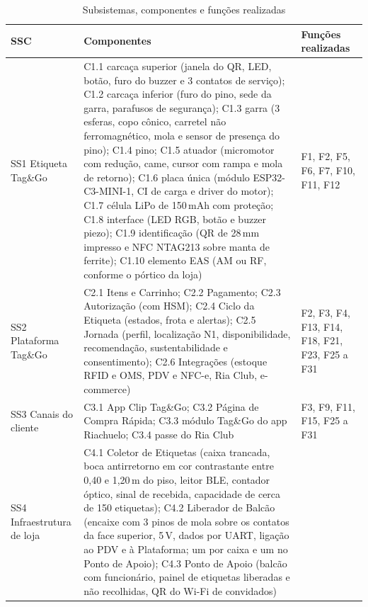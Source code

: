 \begin{table}[htbp]
    \centering
    \caption{Subsistemas, componentes e funções realizadas}
    \label{tab:r2-ssc}
    \scriptsize
    \renewcommand{\arraystretch}{1.25}
    \begin{tabularx}{\textwidth}{@{}
        >{\RaggedRight\arraybackslash}p{2.3cm}
        >{\RaggedRight\arraybackslash}X
        >{\RaggedRight\arraybackslash}p{2.6cm}@{}}
        \toprule
        \textbf{SSC} & \textbf{Componentes} & \textbf{Funções realizadas} \\
        \midrule
        SS1 Etiqueta Tag\&Go
            & C1.1 carcaça superior (janela do QR, LED, botão, furo do buzzer e 3 contatos de serviço); C1.2 carcaça inferior (furo do pino, sede da garra, parafusos de segurança); C1.3 garra (3 esferas, copo cônico, carretel não ferromagnético, mola e sensor de presença do pino); C1.4 pino; C1.5 atuador (micromotor com redução, came, cursor com rampa e mola de retorno); C1.6 placa única (módulo ESP32-C3-MINI-1, CI de carga e driver do motor); C1.7 célula LiPo de 150\,mAh com proteção; C1.8 interface (LED RGB, botão e buzzer piezo); C1.9 identificação (QR de 28\,mm impresso e NFC NTAG213 sobre manta de ferrite); C1.10 elemento EAS (AM ou RF, conforme o pórtico da loja)
            & F1, F2, F5, F6, F7, F10, F11, F12 \\
        \addlinespace
        SS2 Plataforma Tag\&Go
            & C2.1 Itens e Carrinho; C2.2 Pagamento; C2.3 Autorização (com HSM); C2.4 Ciclo da Etiqueta (estados, frota e alertas); C2.5 Jornada (perfil, localização N1, disponibilidade, recomendação, sustentabilidade e consentimento); C2.6 Integrações (estoque RFID e OMS, PDV e NFC-e, Ria Club, e-commerce)
            & F2, F3, F4, F13, F14, F18, F21, F23, F25 a F31 \\
        \addlinespace
        SS3 Canais do cliente
            & C3.1 App Clip Tag\&Go; C3.2 Página de Compra Rápida; C3.3 módulo Tag\&Go do app Riachuelo; C3.4 passe do Ria Club
            & F3, F9, F11, F15, F25 a F31 \\
        \addlinespace
        SS4 Infraestrutura de loja
            & C4.1 Coletor de Etiquetas (caixa trancada, boca antirretorno em cor contrastante entre 0,40 e 1,20\,m do piso, leitor BLE, contador óptico, sinal de recebida, capacidade de cerca de 150 etiquetas); C4.2 Liberador de Balcão (encaixe com 3 pinos de mola sobre os contatos da face superior, 5\,V, dados por UART, ligação ao PDV e à Plataforma; um por caixa e um no Ponto de Apoio); C4.3 Ponto de Apoio (balcão com funcionário, painel de etiquetas liberadas e não recolhidas, QR do Wi-Fi de convidados)

\end{tabularx}
\end{table}
